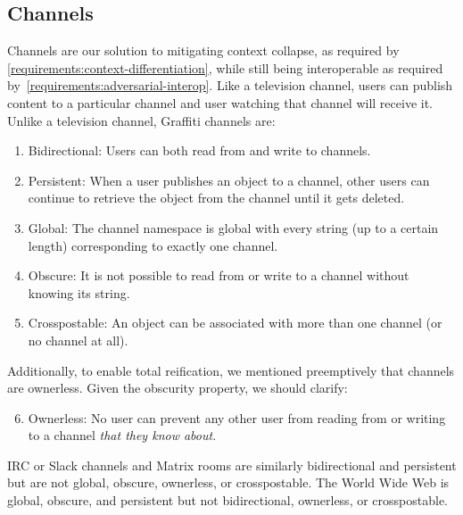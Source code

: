 \subsection{Channels}
\label{concepts:channels}

Channels are our solution to mitigating context collapse, as required by
\ref{requirements:context-differentiation}, while still being
interoperable as required by~\ref{requirements:adversarial-interop}.
Like a television channel, users can publish content to a particular channel
and user watching that channel will receive it.
Unlike a television channel, Graffiti channels are:

\begin{enumerate}
\item
Bidirectional: Users can both read from and write to channels.
\item
Persistent: When a user publishes an object to a channel, other users can
continue to retrieve the object from the channel until it gets deleted.
\item
Global: The channel namespace is global with every string (up to a certain length)
corresponding to exactly one channel.
\item
Obscure: It is not possible to read from or write to a channel without knowing
its string.
\item
Crosspostable: An object can be associated with more than one channel (or no channel at all).
\end{enumerate}

Additionally, to enable total reification, we mentioned preemptively that channels are ownerless.
Given the obscurity property, we should clarify:

\begin{enumerate}
\setcounter{enumi}{5}
\item
Ownerless: No user can prevent any other user from reading from or writing to a channel
\emph{that they know about}.
\end{enumerate}

IRC or Slack channels and Matrix rooms are similarly bidirectional and persistent
but are not global, obscure, ownerless, or crosspostable.
The World Wide Web is global, obscure, and persistent
but not bidirectional, ownerless, or crosspostable.


